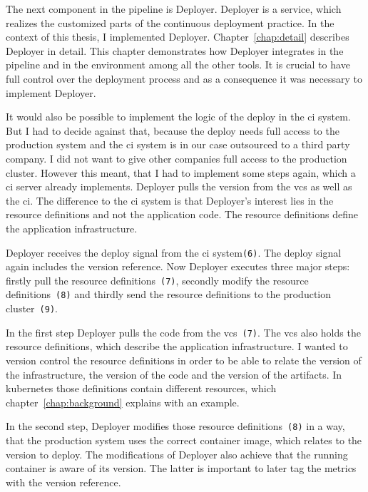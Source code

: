 The next component in the pipeline is Deployer. Deployer is a service, which realizes the
customized parts of the continuous deployment practice. In the context of this thesis, I
implemented Deployer. Chapter~\ref{chap:detail} describes Deployer in detail. This chapter
demonstrates how Deployer integrates in the pipeline and in the environment among all the
other tools. It is crucial to have full control over the deployment process and as a
consequence it was necessary to implement Deployer.

It would also be possible to implement the logic of the deploy in the \gls{ci} system. But
I had to decide against that, because the deploy needs full access to the production
system and the \gls{ci} system is in our case outsourced to a third party company. I did
not want to give other companies full access to the production cluster. However this
meant, that I had to implement some steps again, which a \gls{ci} server already
implements. Deployer pulls the version from the \gls{vcs} as well as the \gls{ci}. The
difference to the \gls{ci} system is that Deployer's interest lies in the resource
definitions and not the application code. The resource definitions define the application
infrastructure.

Deployer receives the deploy signal from the \gls{ci} system\texttt{(6)}. The deploy
signal again includes the version reference. Now Deployer executes three major steps:
firstly pull the resource definitions~\texttt{(7)}, secondly modify the resource
definitions~\texttt{(8)} and thirdly send the resource definitions to the production
cluster~\texttt{(9)}.

In the first step Deployer pulls the code from the \gls{vcs}~\texttt{(7)}. The \gls{vcs}
also holds the resource definitions, which describe the application infrastructure. I
wanted to version control the resource definitions in order to be able to relate the
version of the infrastructure, the version of the code and the version of the
artifacts. In kubernetes those definitions contain different resources, which
chapter~\ref{chap:background} explains with an example.

In the second step, Deployer modifies those resource definitions~\texttt{(8)} in a way,
that the production system uses the correct container image, which relates to the version
to deploy. The modifications of Deployer also achieve that the running container is aware
of its version. The latter is important to later tag the metrics with the version
reference.

